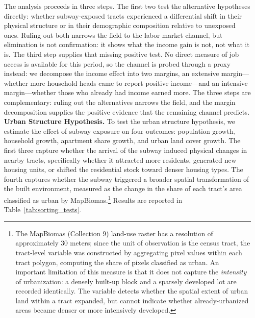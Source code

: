 The analysis proceeds in three steps. The first two test the alternative hypotheses directly: whether subway-exposed tracts experienced a differential shift in their physical structure or in their demographic composition relative to unexposed ones. Ruling out both narrows the field to the labor-market channel, but elimination is not confirmation: it shows what the income gain is not, not what it is. The third step supplies that missing positive test. No direct measure of job access is available for this period, so the channel is probed through a proxy instead: we decompose the income effect into two margins, an extensive margin---whether more household heads came to report positive income---and an intensive margin---whether those who already had income earned more. The three steps are complementary: ruling out the alternatives narrows the field, and the margin decomposition supplies the positive evidence that the remaining channel predicts.\\

\noindent
\textbf{Urban Structure Hypothesis.} To test the urban structure hypothesis, we estimate the effect of subway exposure on four outcomes: population growth, household growth, apartment share growth, and urban land cover growth. The first three capture whether the arrival of the subway induced physical changes in nearby tracts, specifically whether it attracted more residents, generated new housing units, or shifted the residential stock toward denser housing types. The fourth captures whether the subway triggered a broader spatial transformation of the built environment, measured as the change in the share of each tract's area classified as urban by MapBiomas.\footnote{The MapBiomas (Collection 9) land-use raster has a resolution of approximately 30 meters; since the unit of observation is the census tract, the tract-level variable was constructed by aggregating pixel values within each tract polygon, computing the share of pixels classified as urban. An important limitation of this measure is that it does not capture the \emph{intensity} of urbanization: a densely built-up block and a sparsely developed lot are recorded identically. The variable detects whether the spatial extent of urban land within a tract expanded, but cannot indicate whether already-urbanized areas became denser or more intensively developed.} Results are reported in Table~\ref{tab:sorting_tests}.

